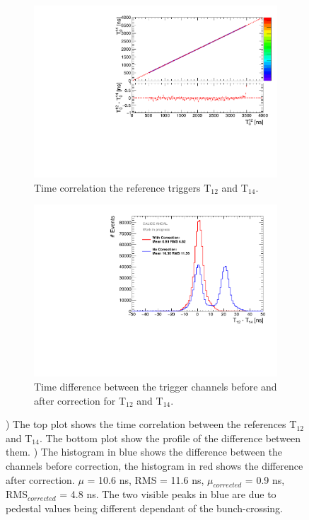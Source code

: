 \begin{figure}[htbp!]
	\begin{subfigure}[t]{0.45\textwidth}
		\centering
		\includegraphics[width=1\textwidth]{chap5/fig_AHCAL_timing/T0s/Correlation_T12vsT14_TDC2ns.pdf}
		\caption{Time correlation the reference triggers T$_{12}$ and T$_{14}$.}\label{fig:Corr_T12T14}
	\end{subfigure}
	\hfill
	\begin{subfigure}[t]{0.45\textwidth}
		\centering
		\includegraphics[width=1\textwidth]{chap5/fig_AHCAL_timing/T0s/T0_Resolution_5.pdf}
		\caption{Time difference between the trigger channels before and after correction for T$_{12}$ and T$_{14}$.}	\label{fig:T0_Correction}
	\end{subfigure}
	\caption{) The top plot shows the time correlation between the references T$_{12}$ and T$_{14}$. The bottom plot show the profile of the difference between them. ) The histogram in blue shows the difference between the channels before correction, the histogram in red shows the difference after correction. $\mu$ = 10.6 ns, RMS = 11.6 ns, $\mu_{corrected}$ = 0.9 ns, RMS$_{corrected}$ = 4.8 ns. The two visible peaks in blue are due to pedestal values being different dependant of the bunch-crossing.}
\end{figure}

